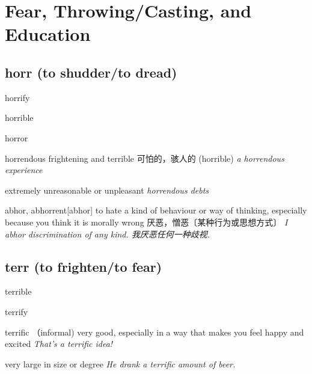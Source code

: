 \chapter{Fear, Throwing/Casting, and Education}

\section{horr (to shudder/to dread)}

\begin{DefWord}{horrify}
\end{DefWord}

\begin{DefWord}{horrible}
\end{DefWord}

\begin{DefWord}{horror}
\end{DefWord}

\begin{DefWord}{horrendous}
    frightening and terrible 可怕的，骇人的 (horrible)
    \textit{a horrendous experience}

    extremely unreasonable or unpleasant
    \textit{horrendous debts}
\end{DefWord}

\begin{DefWord}{abhor, abhorrent}[abhor]
    to hate a kind of behaviour or way of thinking, especially because you think it is morally wrong 厌恶，憎恶〔某种行为或思想方式〕
 \textit{I abhor discrimination of any kind. 我厌恶任何一种歧视. }
\end{DefWord}







\section{terr (to frighten/to fear)}

\begin{DefWord}{terrible}
\end{DefWord}

\begin{DefWord}{terrify}
\end{DefWord}

\begin{DefWord}{terrific}
    （informal) very good, especially in a way that makes you feel happy and excited
    \textit{That’s a terrific idea!}

    very large in size or degree
    \textit{He drank a terrific amount of beer.}
\end{DefWord}

